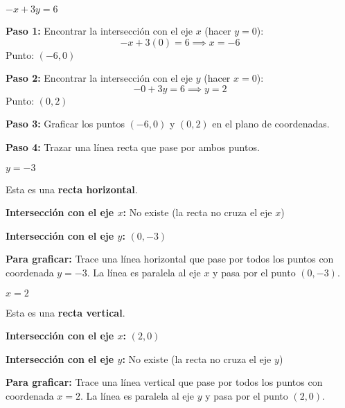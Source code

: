 \begin{exercise}
\problem $-x + 3y = 6$

\begin{solucion}
\textbf{Paso 1:} Encontrar la intersección con el eje $x$ (hacer $y = 0$):
$$-x + 3(0) = 6 \implies x = -6$$
Punto: $(-6, 0)$

\textbf{Paso 2:} Encontrar la intersección con el eje $y$ (hacer $x = 0$):
$$-0 + 3y = 6 \implies y = 2$$
Punto: $(0, 2)$

\textbf{Paso 3:} Graficar los puntos $(-6, 0)$ y $(0, 2)$ en el plano de coordenadas.

\textbf{Paso 4:} Trazar una línea recta que pase por ambos puntos.
\end{solucion}

\problem $y = -3$

\begin{solucion}
Esta es una \textbf{recta horizontal}.

\textbf{Intersección con el eje $x$:} No existe (la recta no cruza el eje $x$)

\textbf{Intersección con el eje $y$:} $(0, -3)$

\textbf{Para graficar:} Trace una línea horizontal que pase por todos los puntos con coordenada $y = -3$. La línea es paralela al eje $x$ y pasa por el punto $(0, -3)$.
\end{solucion}

\problem $x = 2$

\begin{solucion}
Esta es una \textbf{recta vertical}.

\textbf{Intersección con el eje $x$:} $(2, 0)$

\textbf{Intersección con el eje $y$:} No existe (la recta no cruza el eje $y$)

\textbf{Para graficar:} Trace una línea vertical que pase por todos los puntos con coordenada $x = 2$. La línea es paralela al eje $y$ y pasa por el punto $(2, 0)$.
\end{solucion}
\end{exercise}
